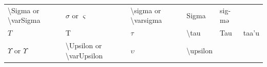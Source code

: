 \documentclass[
]{book}
\begin{document}
\begin{longtable}[]{@{}llllll@{}}
\begin{minipage}[t]{0.17\columnwidth}
\textbackslash Sigma or \textbackslash varSigma\strut
\end{minipage} & \begin{minipage}[t]{0.18\columnwidth}\raggedright
\(\sigma\) or \(\varsigma\)\strut
\end{minipage} & \begin{minipage}[t]{0.17\columnwidth}\raggedright
\textbackslash sigma or \textbackslash varsigma\strut
\end{minipage} & \begin{minipage}[t]{0.06\columnwidth}\raggedright
Sigma\strut
\end{minipage} & \begin{minipage}[t]{0.08\columnwidth}\raggedright
sig-mə\strut
\end{minipage}\tabularnewline
\begin{minipage}[t]{0.18\columnwidth}\raggedright
\(Τ\)\strut
\end{minipage} & \begin{minipage}[t]{0.17\columnwidth}\raggedright
Τ\strut
\end{minipage} & \begin{minipage}[t]{0.18\columnwidth}\raggedright
\(\tau\)\strut
\end{minipage} & \begin{minipage}[t]{0.17\columnwidth}\raggedright
\textbackslash tau\strut
\end{minipage} & \begin{minipage}[t]{0.06\columnwidth}\raggedright
Tau\strut
\end{minipage} & \begin{minipage}[t]{0.08\columnwidth}\raggedright
taa'u\strut
\end{minipage}\tabularnewline
\begin{minipage}[t]{0.18\columnwidth}\raggedright
\(\Upsilon\) or \(\varUpsilon\)\strut
\end{minipage} & \begin{minipage}[t]{0.17\columnwidth}\raggedright
\textbackslash Upsilon or \textbackslash varUpsilon\strut
\end{minipage} & \begin{minipage}[t]{0.18\columnwidth}\raggedright
\(\upsilon\)\strut
\end{minipage} & \begin{minipage}[t]{0.17\columnwidth}\raggedright
\textbackslash upsilon\strut
\end{minipage} & \begin{minipage}[t]{0.06\columnwidth}\raggedright

\end{minipage}
\end{longtable}
\end{document}
